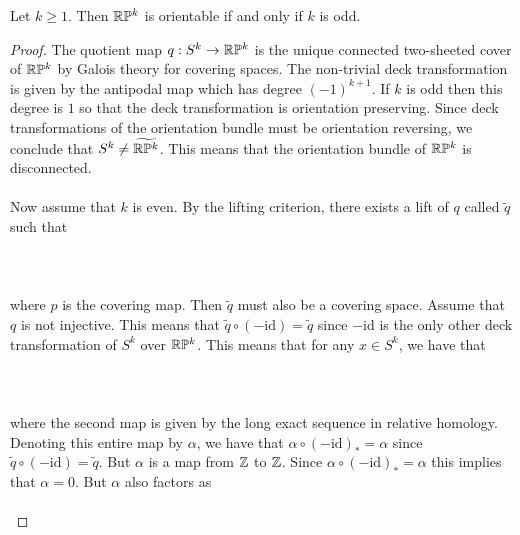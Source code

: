 \documentclass[a4paper]{article}
\begin{document}
\begin{prp}{}{} Let $k\geq 1$. Then $\mathbb{R}\mathbb{P}^k$ is orientable if and only if $k$ is odd. \tcbline
\begin{proof}
The quotient map $q:S^k\to\mathbb{R}\mathbb{P}^k$ is the unique connected two-sheeted cover of $\mathbb{R}\mathbb{P}^k$ by Galois theory for covering spaces. The non-trivial deck transformation is given by the antipodal map which has degree $(-1)^{k+1}$. If $k$ is odd then this degree is $1$ so that the deck transformation is orientation preserving. Since deck transformations of the orientation bundle must be orientation reversing, we conclude that $S^k\neq\widetilde{\mathbb{R}\mathbb{P}^k}$. This means that the orientation bundle of $\mathbb{R}\mathbb{P}^k$ is disconnected. \\~\\

Now assume that $k$ is even. By the lifting criterion, there exists a lift of $q$ called $\tilde{q}$ such that \\~\\
\\~\\
where $p$ is the covering map. Then $\tilde{q}$ must also be a covering space. Assume that $q$ is not injective. This means that $\tilde{q}\circ(-\text{id})=\tilde{q}$ since $-\text{id}$ is the only other deck transformation of $S^k$ over $\mathbb{R}\mathbb{P}^k$. This means that for any $x\in S^k$, we have that \\~\\
\\~\\
where the second map is given by the long exact sequence in relative homology. Denoting this entire map by $\alpha$, we have that $\alpha\circ(-\text{id})_\ast=\alpha$ since $\tilde{q}\circ(-\text{id})=\tilde{q}$. But $\alpha$ is a map from $\mathbb{Z}$ to $\mathbb{Z}$. Since $\alpha\circ(-\text{id})_\ast=\alpha$ this implies that $\alpha=0$. But $\alpha$ also factors as \\~\\

\end{proof}
\end{prp}
\end{document}
